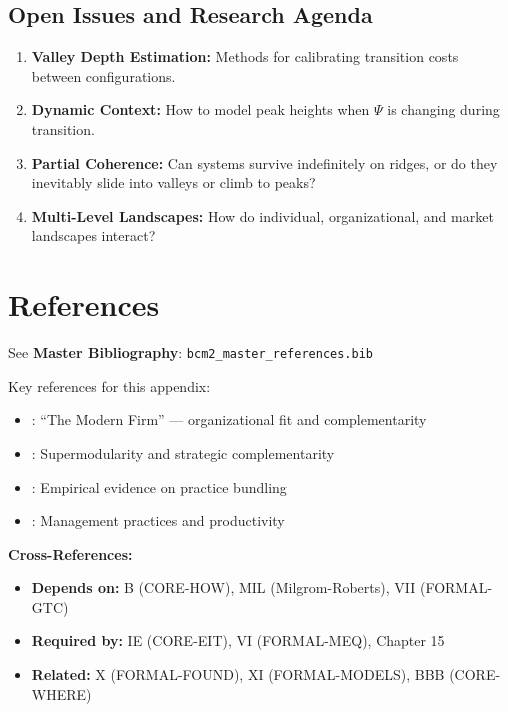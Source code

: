 
\subsection{Open Issues and Research Agenda}

\begin{enumerate}
\item \textbf{Valley Depth Estimation:} Methods for calibrating transition costs between configurations.
\item \textbf{Dynamic Context:} How to model peak heights when $\Psi$ is changing during transition.
\item \textbf{Partial Coherence:} Can systems survive indefinitely on ridges, or do they inevitably slide into valleys or climb to peaks?
\item \textbf{Multi-Level Landscapes:} How do individual, organizational, and market landscapes interact?
\end{enumerate}


\section{References}
\label{sec:nc-references}

See \textbf{Master Bibliography}: \texttt{bcm2\_master\_references.bib}

\nocite{bcm_master}

Key references for this appendix:
\begin{itemize}[nosep]
\item \citet{roberts2004}: ``The Modern Firm'' --- organizational fit and complementarity
\item \citet{milgrom1990}: Supermodularity and strategic complementarity
\item \citet{ichniowski1997}: Empirical evidence on practice bundling
\item \citet{bloom2007}: Management practices and productivity
\end{itemize}


\begin{tcolorbox}[colback=gray!5!white, colframe=gray!50!black]
\textbf{Cross-References:}
\begin{itemize}[nosep]
\item \textbf{Depends on:} B (CORE-HOW), MIL (Milgrom-Roberts), VII (FORMAL-GTC)
\item \textbf{Required by:} IE (CORE-EIT), VI (FORMAL-MEQ), Chapter 15
\item \textbf{Related:} X (FORMAL-FOUND), XI (FORMAL-MODELS), BBB (CORE-WHERE)
\end{itemize}
\end{tcolorbox}
